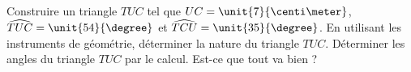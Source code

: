 
\begin{exercice}\label{exosmath-0780}


Construire un triangle \( TUC\) tel que \( UC=\unit{7}{\centi\meter}\), \( \widehat{TUC}=\unit{54}{\degree}\) et \( \widehat{TCU}=\unit{35}{\degree}\). En utilisant les instruments de géométrie, déterminer la nature du triangle \( TUC\). Déterminer les angles du triangle \( TUC\) par le calcul. Est-ce que tout va bien ?

\end{exercice}
